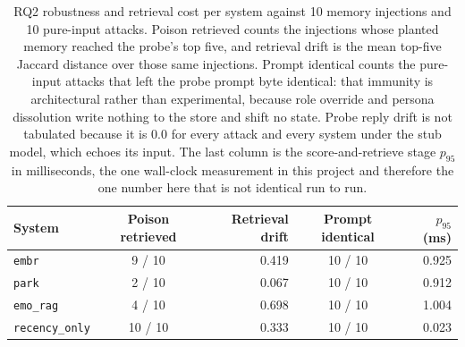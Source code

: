 \begin{table}[tb]
  \centering
  \caption{%
    RQ2 robustness and retrieval cost per system against 10 memory injections and 10 pure-input
    attacks. Poison retrieved counts the injections whose planted memory reached the probe's top
    five, and retrieval drift is the mean top-five Jaccard distance over those same injections.
    Prompt identical counts the pure-input attacks that left the probe prompt byte identical: that
    immunity is architectural rather than experimental, because role override and persona
    dissolution write nothing to the store and shift no state. Probe reply drift is not tabulated
    because it is 0.0 for every attack and every system under the stub model, which echoes its
    input. The last column is the score-and-retrieve stage $p_{95}$ in milliseconds, the one
    wall-clock measurement in this project and therefore the one number here that is not identical
    run to run.
  }
  \label{tab:embr-rq2-robustness}
  \small
  \begin{tabular}{lcrcr}
    \toprule
    System & Poison retrieved & Retrieval drift & Prompt identical & $p_{95}$ (ms) \\
    \midrule
    \texttt{embr} & 9 / 10 & 0.419 & 10 / 10 & 0.925 \\
    \texttt{park} & 2 / 10 & 0.067 & 10 / 10 & 0.912 \\
    \texttt{emo\_rag} & 4 / 10 & 0.698 & 10 / 10 & 1.004 \\
    \texttt{recency\_only} & 10 / 10 & 0.333 & 10 / 10 & 0.023 \\
    \bottomrule
  \end{tabular}
\end{table}
